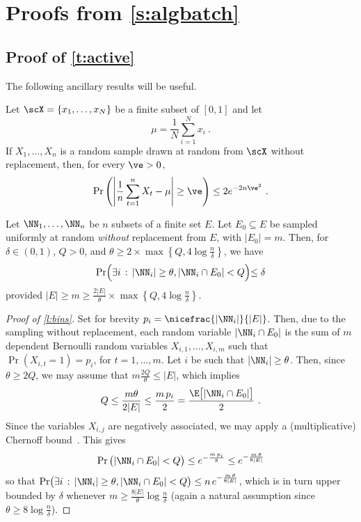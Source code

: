 \section{Proofs from \autoref{s:algbatch}}

\subsection{Proof of \autoref{t:active}}
\label{ssec:troll_proof_bayes}

The following ancillary results will be useful.

\begin{lemma}
\label{l:hoeff-wr}
Let $\scX = \{x_1,\dots,x_N\}$ be a finite subset of $[0,1]$ and let
\[ \mu = \frac{1}{N}\sum_{i=1}^N x_i~.  \]
If $X_1,\dots,X_n$ is a random sample drawn at random from $\scX$ without replacement, then, for
every $\ve > 0$,
\[
  \Pr\left( \left|\frac{1}{n}\sum_{t=1}^n X_t - \mu \right| \ge \ve \right) \le 2e^{-2n\ve^2}~.
\]
\end{lemma}

\begin{lemma}\label{l:bins}
Let $\NN_1, \ldots, \NN_n$ be $n$ subsets of a finite set $E$.
Let $E_0 \subseteq E$ be sampled uniformly at random {\em without} replacement from $E$, with $|E_0| = m$. Then, for $\delta \in (0,1)$, $Q > 0$, and $\theta \geq 2\times\max\left\{Q,4\log \frac{n}{\delta}\right\}$, we have
\[
\Pr\Bigl( \exists i \,:\, |\NN_i| \geq \theta, |\NN_i \cap E_0| < Q\Bigl) \leq \delta
\]
provided $|E| \geq m \geq \frac{2|E|}{\theta}\times\max\left\{Q,4\log \frac{n}{\delta}\right\}$.
\end{lemma}

\begin{proof}[Proof of \autoref{l:bins}]
  Set for brevity $p_i = \nicefrac{|\NN_i|}{|E|}$. Then, due to the sampling without replacement,
  each random
variable $|\NN_i \cap E_0|$ is the sum of $m$ dependent Bernoulli random variables $X_{i,1}, \ldots,
X_{i,m}$ such that $\Pr(X_{i,t} = 1) = p_i$, for $t = 1, \ldots, m$. Let $i$ be such that $|\NN_i|
\geq \theta$. Then, since $\theta \geq 2Q$, we may assume that $m\frac{2Q}{\theta} \leq |E|$, which implies
\[
Q \leq \frac{m\theta}{2|E|} \leq \frac{m\,p_i}{2} = \frac{\E\big[|\NN_i \cap E_0|\big]}{2}~.
\]
Since the variables $X_{i,j}$ are negatively associated, we may apply a (multiplicative) Chernoff
bound~\autocite[Section~3.1]{dpbook}.
This gives
\[
\Pr\big(|\NN_i \cap E_0| < Q\big) \leq e^{-\frac{m\,p_i}{8}} \leq e^{-\frac{m\,\theta}{8|E|}}
\]
so that
$
\Pr\bigl( \exists i\,:\, |\NN_i| \geq \theta, |\NN_i \cap E_0| < Q\bigr) \leq n\,e^{-\frac{m\,\theta}{8|E|}}
$,
which is in turn upper bounded by $\delta$ whenever 
$m \geq \frac{8|E|}{\theta}\log \frac{n}{\delta}$ (again a natural assumption since $\theta \geq
8\log\frac{n}{\delta}$). %
\end{proof}

